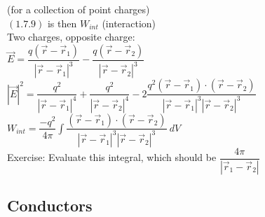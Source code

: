\documentclass[a4paper,11pt]{article}
\begin{document}
(for a collection of point charges)\\
$(1.7.9)$ is then $W_{int}$ (interaction)\\
Two charges, opposite charge:\\
$\vec{E}=\dfrac{q(\vec{r}-\vec{r}_1)}{|\vec{r}-\vec{r}_1|^3}-\dfrac{q(\vec{r}-\vec{r}_2)}{|\vec{r}-\vec{r}_2|^3}$\\
$|\vec{E}|^2=\dfrac{q^2}{|\vec{r}-\vec{r}_1|^4}+\dfrac{q^2}{|\vec{r}-\vec{r}_2|^4}-2\dfrac{q^2(\vec{r}-\vec{r}_1)\cdot(\vec{r}-\vec{r}_2)}{|\vec{r}-\vec{r}_1|^3|\vec{r}-\vec{r}_2|^3}$\\
$W_{int}=\dfrac{-q^2}{4\pi}\int\dfrac{(\vec{r}-\vec{r}_1)\cdot(\vec{r}-\vec{r}_2)}{|\vec{r}-\vec{r}_1|^3|\vec{r}-\vec{r}_2|^3}~dV$\\
Exercise: Evaluate this integral, which should be $\dfrac{4\pi}{|\vec{r}_1-\vec{r}_2|}$

\subsection{Conductors}
\end{document}
